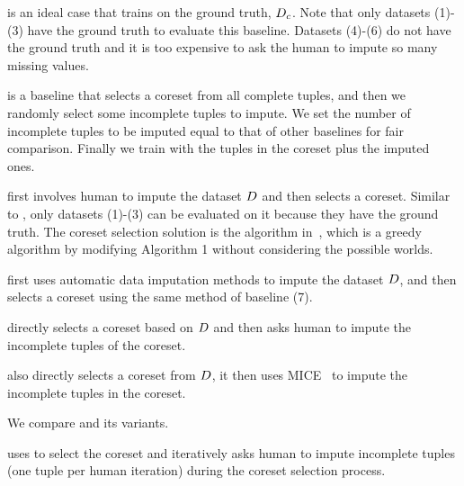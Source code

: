  is an ideal case that trains on the ground truth, \ie $D_c$. Note that only datasets (1)-(3) have the ground truth to evaluate this baseline.  Datasets (4)-(6) do not have the ground truth and it is  too expensive to ask the human to impute so many missing values.

 is a baseline that selects a coreset from all complete tuples, and then we randomly select some incomplete tuples to impute. We set the number of incomplete tuples to be imputed equal to that of  other baselines for fair comparison. Finally we train with the tuples in the coreset plus the  imputed ones.






 first involves human to impute the dataset $D$ and then selects a coreset. Similar to \truth, only datasets (1)-(3) can be evaluated on it because they have the ground truth. The coreset selection solution is the algorithm in~\cite{DBLP:conf/icml/MirzasoleimanBL20}, which is a greedy algorithm by modifying Algorithm 1 without considering the possible worlds.


 first uses automatic data imputation methods to impute the dataset $D$, and then selects a coreset using the same method of baseline (7).

 directly selects a coreset based on $D$ and then asks human to impute the incomplete tuples of the coreset.

 also directly selects a coreset from $D$, it then uses MICE~\cite{royston2011multiple} to impute the incomplete tuples in the coreset.

 We compare \ours and its variants.

 uses \ours to select the coreset and iteratively asks human to impute incomplete tuples (one tuple per human iteration) during the coreset selection process.

